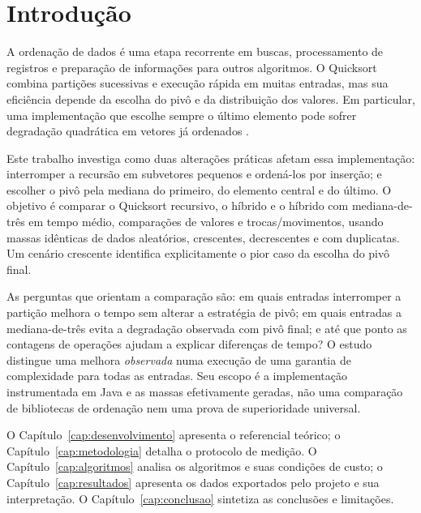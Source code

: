 \chapter{Introdução}
\label{intro}

A ordenação de dados é uma etapa recorrente em buscas, processamento de registros e preparação de informações para outros algoritmos. O Quicksort combina partições sucessivas e execução rápida em muitas entradas, mas sua eficiência depende da escolha do pivô e da distribuição dos valores. Em particular, uma implementação que escolhe sempre o último elemento pode sofrer degradação quadrática em vetores já ordenados \cite{cormen2012,gfg_quick}.

Este trabalho investiga como duas alterações práticas afetam essa implementação: interromper a recursão em subvetores pequenos e ordená-los por inserção; e escolher o pivô pela mediana do primeiro, do elemento central e do último. O objetivo é comparar o Quicksort recursivo, o híbrido e o híbrido com mediana-de-três em tempo médio, comparações de valores e trocas/movimentos, usando massas idênticas de dados aleatórios, crescentes, decrescentes e com duplicatas. Um cenário crescente identifica explicitamente o pior caso da escolha do pivô final.

As perguntas que orientam a comparação são: em quais entradas interromper a partição melhora o tempo sem alterar a estratégia de pivô; em quais entradas a mediana-de-três evita a degradação observada com pivô final; e até que ponto as contagens de operações ajudam a explicar diferenças de tempo? O estudo distingue uma melhora \emph{observada} numa execução de uma garantia de complexidade para todas as entradas. Seu escopo é a implementação instrumentada em Java e as massas efetivamente geradas, não uma comparação de bibliotecas de ordenação nem uma prova de superioridade universal.

O Capítulo~\ref{cap:desenvolvimento} apresenta o referencial teórico; o Capítulo~\ref{cap:metodologia} detalha o protocolo de medição. O Capítulo~\ref{cap:algoritmos} analisa os algoritmos e suas condições de custo; o Capítulo~\ref{cap:resultados} apresenta os dados exportados pelo projeto e sua interpretação. O Capítulo~\ref{cap:conclusao} sintetiza as conclusões e limitações.

